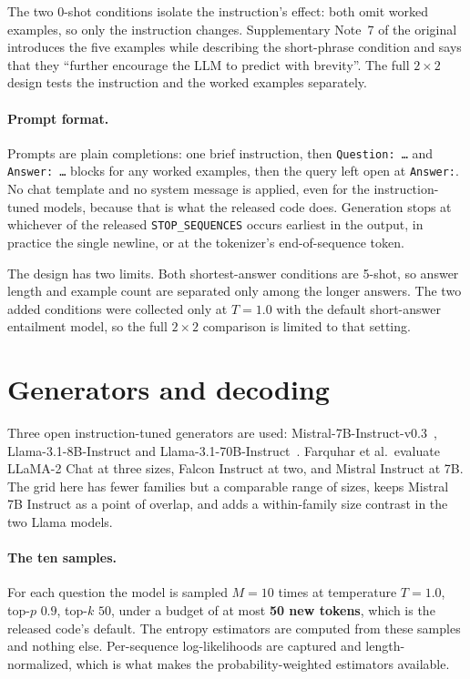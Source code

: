 The two 0-shot conditions isolate the instruction's effect: both omit worked
examples, so only the instruction changes. Supplementary Note~7 of the original
introduces the five examples while describing the short-phrase condition and
says that they ``further encourage the LLM to predict with brevity''. The full
$2\times2$ design tests the instruction and the worked examples separately.

\paragraph{Prompt format.} Prompts are plain completions: one brief
instruction, then \texttt{Question:\ \ldots} and \texttt{Answer:\ \ldots}
blocks for any worked examples, then the query left open at \texttt{Answer:}.
No chat template and no system message is applied, even for the
instruction-tuned models, because that is what the released code does.
Generation stops at whichever of the released \texttt{STOP\_SEQUENCES} occurs
earliest in the output, in practice the single newline, or at the tokenizer's
end-of-sequence token.

The design has two limits. Both shortest-answer conditions are 5-shot, so answer
length and example count are separated only among the longer answers. The two
added conditions were collected only at $T=1.0$ with the default short-answer
entailment model, so the full $2\times2$ comparison is limited to that setting.

\section{Generators and decoding}
\label{sec:sampling-settings}

Three open instruction-tuned generators are used:
Mistral-7B-Instruct-v0.3~\cite{jiang_mistral_2023,mistral_instruct_v03_model_card},
Llama-3.1-8B-Instruct and Llama-3.1-70B-Instruct~\cite{grattafiori_llama3_2024}.
Farquhar et al.\ evaluate LLaMA-2 Chat at three sizes, Falcon Instruct at two,
and Mistral Instruct at 7B. The grid here has fewer families but a comparable
range of sizes, keeps Mistral 7B Instruct as a point of overlap, and adds a
within-family size contrast in the two Llama models.

\paragraph{The ten samples.} For each question the model is sampled $M=10$
times at temperature $T=1.0$, top-$p$ $0.9$, top-$k$ $50$, under a budget of at
most \textbf{50 new tokens}, which is the released code's default. The entropy estimators are computed from these
samples and nothing else. Per-sequence log-likelihoods are captured and
length-normalized, which is what makes the probability-weighted estimators
available.

